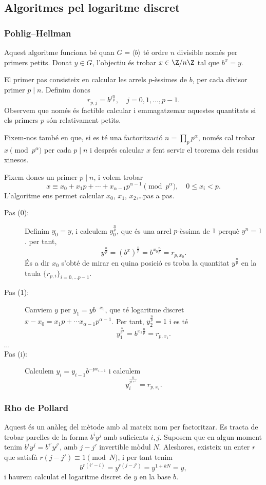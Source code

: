 \subsection{Algoritmes pel logaritme discret}
 

  \subsubsection{Pohlig--Hellman}
  Aquest algoritme funciona bé quan $G=\langle b\rangle$ té ordre $n$ divisible només per primers petits. Donat $y\in G$, l'objectiu és trobar $x\in\Z/n\Z$ tal que $b^x=y$.
  
  El primer pas consisteix en calcular les arrels $p$-èssimes de $b$, per cada divisor primer $p\mid n$. Definim doncs
  \[
  r_{p,j} = b^{j\frac{n}{p}},\quad j=0,1,\ldots,p-1.
  \]
  Observem que només és factible calcular i emmagatzemar aquestes quantitats si els primers $p$ són relativament petits.
  
  Fixem-nos també en que, si es té una factorització $n=\prod_{p} p^\alpha$, només cal trobar $x\pmod{p^\alpha}$ per cada $p\mid n$ i després calcular $x$ fent servir el teorema dels residus xinesos.
  
  Fixem doncs un primer $p\mid n$, i volem trobar
  \[
  x\equiv x_0+x_1p+\cdots+x_{\alpha-1}p^{\alpha-1}\pmod{p^\alpha},\quad 0\leq x_i<p.
  \]
  L'algoritme ens permet calcular $x_0$, $x_1$, $x_2$,\ldots pas a pas.
  
  \begin{description}
      \item[Pas (0):] Definim $y_0=y$, i calculem $y_0^{\frac{n}{p}}$, que és una arrel $p$-èssima de $1$ perquè $y^n=1$. per tant,
      \[
      y^{\frac{n}{p}} = (b^x)^{\frac{n}{p}} = b^{x_0\frac{n}{p}} = r_{p,x_0}.
      \]
      És a dir $x_0$ s'obté de mirar en quina posició es troba la quantitat $y^{\frac{n}{p}}$ en la taula $\{r_{p,i}\}_{i=0,\ldots p-1}$.
      \item[Pas (1):] Canviem $y$ per $y_1=yb^{-x_0}$, que té logaritme discret $x-x_0=x_1p+\cdots x_{\alpha-1}p^{\alpha-1}$. Per tant, $y_2^{\frac{n}{p}}=1$ i es té 
      \[
      y_1^{\frac{n}{p^2}}=b^{x_1\frac{n}{p}} = r_{p,x_1}.
      \]
      \item[$\cdots$]
      \item[Pas (i):] Calculem $y_i=y_{i-1}b^{-px_{i-1}}$ i calculem
      \[
      y_i^{\frac{n}{p^{i+1}}} = r_{p,x_i}.
      \]
  \end{description}
  
  
  \subsubsection{Rho de Pollard}
  Aquest és un anàleg del mètode amb al mateix nom per factoritzar. Es tracta de trobar parelles de la forma $b^iy^j$ amb suficients $i,j$. Suposem que en algun moment tenim $b^iy^j=b^{i'}y^{j'}$, amb $j- j'$ invertible mòdul $N$. Aleshores, existeix un enter $r$ que satisfà $r(j-j')\equiv 1\pmod N$, i per tant tenim
  \[
  b^{r(i'-i)} = y^{r(j-j')} = y^{1+kN}=y,
  \]
  i haurem calculat el logaritme discret de $y$ en la base $b$.
  
